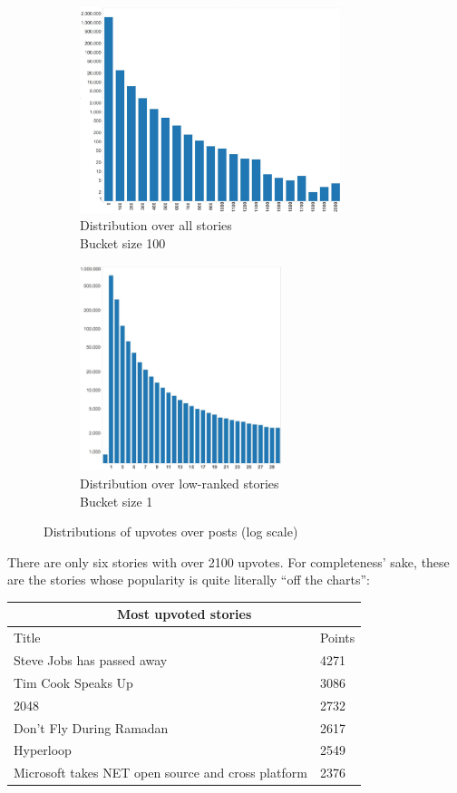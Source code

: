\begin{figure}[ht!]
\centering
\begin{subfigure}{.55\textwidth}
  \centering
  \includegraphics[height=6cm]{upvote_distribution_all}
  \caption{Distribution over all stories\\Bucket size 100}
  \label{fig:distribution_all}
\end{subfigure}%
\begin{subfigure}{.45\textwidth}
  \centering
  \includegraphics[height=6cm]{upvote_distribution_zoomed_in}
  \caption{Distribution over low-ranked stories\\Bucket size 1}
  \label{fig:distribution_zoomed_in}
\end{subfigure}
\caption{Distributions of upvotes over posts (log scale)}
\label{fig:distribution}
\end{figure}

There are only six stories with over 2100 upvotes. For completeness' sake, these are the stories whose popularity is quite literally ``off the charts'':
\begin{center}
    \begin{tabular}{|p{=8.5cm}|p{2cm}|}
       \hline
       \multicolumn{2}{|c|}{Most upvoted stories} \\
       \hline
       Title 																				& Points \\
       \hline
       Steve Jobs has passed away 										& 4271\\
		Tim Cook Speaks Up														& 3086\\
		2048																			& 2732\\
		Don't Fly During Ramadan											& 2617\\
		Hyperloop																		& 2549\\
		Microsoft takes NET open source and cross platform	& 2376\\
        \hline
    \end{tabular}
\end{center}

